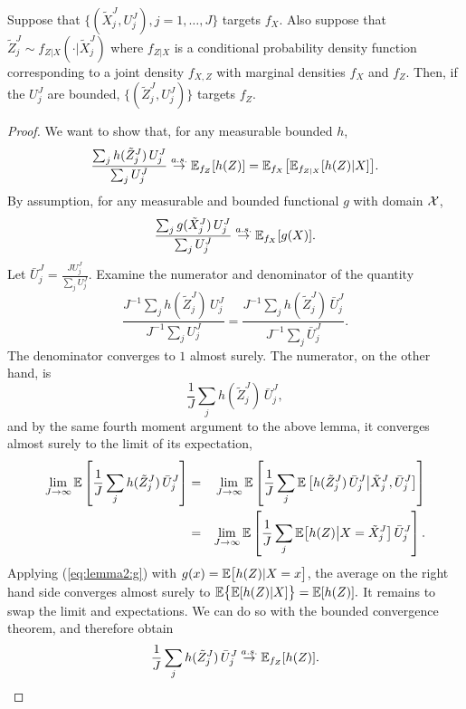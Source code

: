 \begin{lem}
    \label{lem:marginal-proper-weights}
    Suppose that $\{(\tilde X_j^J,U_j^J),j=1,\dots,J\}$ targets $f_X$. Also suppose that $\tilde Z_j^J \sim f_{Z|X}(\cdot | \tilde X_j^J)$ where $f_{Z|X}$ is a conditional probability density function corresponding to a joint density $f_{X,Z}$ with marginal densities $f_X$ and $f_Z$. Then, if the $U_j^J$ are bounded, $\{(\tilde Z_j^J,U_j^J)\}$ targets $f_Z$.
\end{lem}
\begin{proof}
    We want to show that, for any measurable bounded $h$, 
     \begin{equation}
     \frac{\sum_j h(\tilde Z_j^J) \, U_j^J}{\sum_j U_j^J} \stackrel{a.s.}{\to} \mathbb{E}_{f_Z}[h(Z)] = \mathbb{E}_{f_X}\big[\mathbb{E}_{f_{Z|X}}[h(Z) | X]\big].
     \end{equation}
    By assumption, for any measurable and bounded functional $g$ with domain ${\mathcal{X}}$,
    \begin{equation}\label{eq:lemma2:g}
    \frac{\sum_j g(\tilde X_j^J)\, U_j^J}{\sum_j U_j^J} \stackrel{a.s.}{\to} \mathbb{E}_{f_X}[g(X)].
    \end{equation}
    Let $\bar{U}_j^J = \frac{J U_j^J}{\sum_j U_j^J}$. Examine the numerator and denominator of the quantity \begin{equation}\frac{J^{-1}\sum_j h(\tilde Z_j^J) \, U_j^J}{J^{-1}\sum_j U_j^J} = \frac{J^{-1}\sum_j h(\tilde Z_j^J) \, \bar{U}_j^J}{J^{-1}\sum_j \bar{U}_j^J}.\end{equation}
    The denominator converges to $1$ almost surely. The numerator, on the other hand, is
    \begin{equation}
    \frac{1}{J}\sum_j h(\tilde Z_j^J)\, \bar{U}_j^J,
    \end{equation}
    and by the same fourth moment argument to the above lemma, it converges almost surely to the limit of its expectation,
    \begin{eqnarray}        
    \lim_{J\to\infty} \mathbb{E}\left[\frac{1}{J}\sum_j h(\tilde Z_j^J)\, \bar{U}_j^J\right] 
    &=& \lim_{J\to\infty} \mathbb{E} \left[\frac{1}{J}\sum_j  
      \mathbb{E}\left[ h(\tilde Z_j^J)\, \bar{U}_j^J\big|\tilde X_j^J, \bar U_j^J\right]
    \right]
    \\
    &=& \lim_{J\to\infty} \mathbb{E} \left[\frac{1}{J}\sum_j  \mathbb{E}\big[h(Z) \big| X=\tilde X_j^J \big] \, \bar U_j^J\right].
    \end{eqnarray}
    Applying (\ref{eq:lemma2:g}) with $g(x) = \mathbb{E}\big[h(Z) | X=x\big]$, the average on the right hand side converges almost surely to $\mathbb{E}\big\{\mathbb{E}[h(Z)|X]\big\}=\mathbb{E}[h(Z)].$
    It remains to swap the limit and expectations. We can do so with the bounded convergence theorem, and therefore obtain   
    \begin{equation}\frac{1}{J}\sum_j h(\tilde Z_j^J)\,\bar{U}_j^J \stackrel{a.s.}{\to} \mathbb{E}_{f_Z}[h(Z)].\end{equation} 
    \end{proof}

